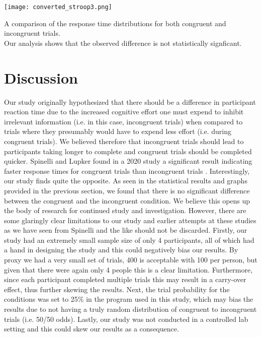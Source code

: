 \documentclass{article}
\begin{document}
\begin{center}
\texttt{[image: converted\_stroop3.png]}
\end{center}

\begin{center}
A comparison of the response time distributions for both congruent and incongruent trials.\\ Our analysis shows that the observed difference is not statistically signficant.
\end{center}

\section{Discussion}
\label{sec:orgfa94e98}

\hspace{1em} Our study originally hypothesized that there should be a difference in participant reaction time due to the increased cognitive effort one must expend to inhibit irrelevant information (i.e. in this case, incongruent trials) when compared to trials where they presumably would have to expend less effort (i.e. during congruent trials). We believed therefore that incongruent trials should lead to participants taking longer to complete and congruent trials should be completed quicker. Spinelli and Lupker found in a 2020 study a significant result indicating faster response times for congruent trials than incongruent trials \cite{SpinelliGiacomo2020I}. Interestingly, our study finds quite the opposite. As seen in the statistical results and graphs provided in the previous section, we found that there is no significant difference between the congruent and the incongruent condition. We believe this opens up the body of research for continued study and investigation. However, there are some glaringly clear limitations to our study and earlier attempts at these studies as we have seen from Spinelli and the like should not be discarded. Firstly, our study had an extremely small sample size of only 4 participants, all of which had a hand in designing the study and this could negatively bias our results. By proxy we had a very small set of trials, 400 is acceptable with 100 per person, but given that there were again only 4 people this is a clear limitation. Furthermore, since each participant completed multiple trials this may result in a carry-over effect, thus further skewing the results. Next, the trial probability for the conditions was set to 25\% in the program used in this study, which may bias the results due to not having a truly random distribution of congruent to incongruent trials (i.e. 50/50 odds). Lastly, our study was not conducted in a controlled lab setting and this could skew our results as a consequence. 


\end{document}
